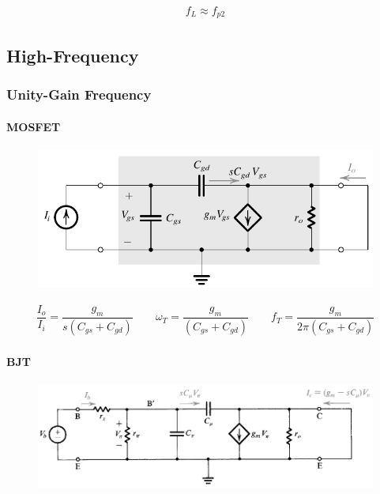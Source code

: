 \begin{equation*}
  \begin{aligned}
    f_L \approx f_{p2}
  \end{aligned}
\end{equation*}

\subsection{High-Frequency}

\subsubsection{Unity-Gain Frequency}

\paragraph{MOSFET}

\begin{figure}[H]
  \centering
  \includegraphics[width=0.5\linewidth]{figures/Frequency-Response-UG-MOS}
\end{figure}

\begin{equation*}
  \begin{aligned}
    \dfrac{I_o}{I_i} = \dfrac{g_m}{s \left( C_{gs} + C_{gd} \right)}  \quad\quad \omega_T = \dfrac{g_m}{\left( C_{gs} + C_{gd} \right)} \quad\quad f_T = \dfrac{g_m}{2 \pi \left( C_{gs} + C_{gd} \right)} 
  \end{aligned}
\end{equation*}

\paragraph{BJT}

\begin{figure}[H]
  \centering
  \includegraphics[width=0.7\linewidth]{figures/Frequency-Response-UG-BJT}
\end{figure}


